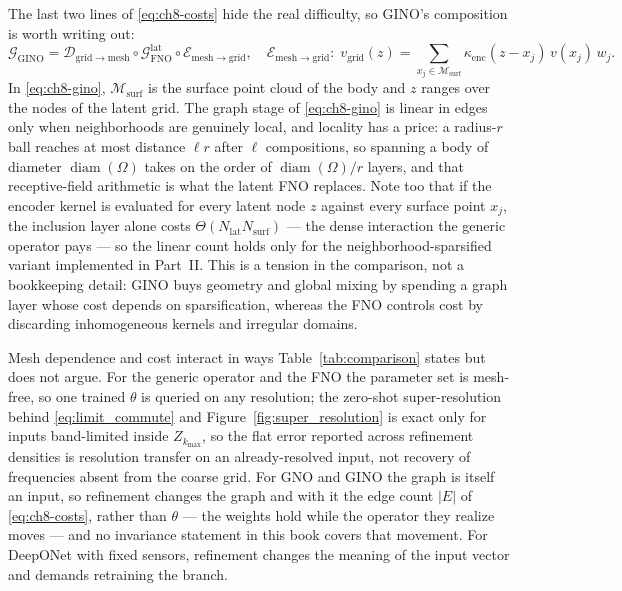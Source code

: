 The last two lines of \eqref{eq:ch8-costs} hide the real difficulty, so GINO's composition is worth writing out:
\begin{equation}
  \label{eq:ch8-gino}
  \mathcal{G}_{\mathrm{GINO}}
  = \mathcal{D}_{\mathrm{grid}\to\mathrm{mesh}}
  \circ \mathcal{G}^{\mathrm{lat}}_{\mathrm{FNO}}
  \circ \mathcal{E}_{\mathrm{mesh}\to\mathrm{grid}},
  \quad
  \mathcal{E}_{\mathrm{mesh}\to\mathrm{grid}}:\;
  v_{\mathrm{grid}}(z)=\sum_{x_j\in\mathcal{M}_{\mathrm{surf}}}\kappa_{\mathrm{enc}}(z-x_j)\,v(x_j)\,w_j .
\end{equation}
In \eqref{eq:ch8-gino}, $\mathcal{M}_{\mathrm{surf}}$ is the surface point cloud of the body and $z$ ranges over the nodes of the latent grid. The graph stage of \eqref{eq:ch8-gino} is linear in edges only when neighborhoods are genuinely local, and locality has a price: a radius-$r$ ball reaches at most distance $\ell r$ after $\ell$ compositions, so spanning a body of diameter $\operatorname{diam}(\Omega)$ takes on the order of $\operatorname{diam}(\Omega)/r$ layers, and that receptive-field arithmetic is what the latent FNO replaces. Note too that if the encoder kernel is evaluated for every latent node $z$ against every surface point $x_j$, the inclusion layer alone costs $\Theta(N_{\mathrm{lat}}N_{\mathrm{surf}})$ --- the dense interaction the generic operator pays --- so the linear count holds only for the neighborhood-sparsified variant implemented in Part~II. This is a tension in the comparison, not a bookkeeping detail: GINO buys geometry and global mixing by spending a graph layer whose cost depends on sparsification, whereas the FNO controls cost by discarding inhomogeneous kernels and irregular domains.

Mesh dependence and cost interact in ways Table~\ref{tab:comparison} states but does not argue. For the generic operator and the FNO the parameter set is mesh-free, so one trained $\theta$ is queried on any resolution; the zero-shot super-resolution behind \eqref{eq:limit_commute} and Figure~\ref{fig:super_resolution} is exact only for inputs band-limited inside $Z_{k_{\max}}$, so the flat error reported across refinement densities is resolution transfer on an already-resolved input, not recovery of frequencies absent from the coarse grid. For GNO and GINO the graph is itself an input, so refinement changes the graph and with it the edge count $|E|$ of \eqref{eq:ch8-costs}, rather than $\theta$ --- the weights hold while the operator they realize moves --- and no invariance statement in this book covers that movement. For DeepONet with fixed sensors, refinement changes the meaning of the input vector and demands retraining the branch.

